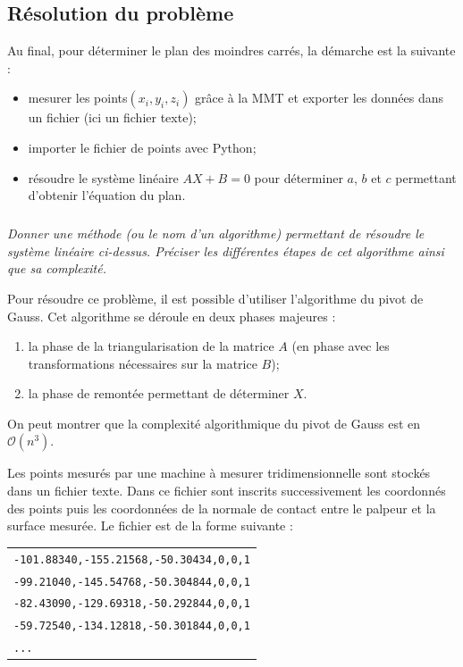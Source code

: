 \documentclass[10pt,fleqn]{article} %
\begin{document}
\else
\fi


\subsection{Résolution du problème}
\ifprof
\else
\begin{methode}
Au final, pour déterminer le plan des moindres carrés, la démarche est la suivante :
\begin{itemize}
\item mesurer les points$(x_i,y_i,z_i)$ grâce à la MMT et exporter les données dans un fichier (ici un fichier texte);
\item importer le fichier de points avec Python;
\item résoudre le système linéaire $AX+B=0$ pour déterminer $a$, $b$ et $c$ permettant d'obtenir l'équation du plan. 
\end{itemize}
\end{methode}
\fi

\subparagraph{}
\textit{Donner une méthode (ou le nom d'un algorithme) permettant de résoudre le système linéaire ci-dessus. Préciser les différentes étapes de cet algorithme ainsi que sa complexité.}


\ifprof
\begin{corrige}
Pour résoudre ce problème, il est possible d'utiliser l'algorithme du pivot de Gauss. Cet algorithme se déroule en deux phases majeures : 
\begin{enumerate}
\item la phase de la triangularisation de la matrice $A$ (en phase avec les transformations nécessaires sur la matrice $B$);
\item la phase de remontée permettant de déterminer $X$. 
\end{enumerate}

On peut montrer que la complexité algorithmique du pivot de Gauss est en $\mathcal{O}\left(n^3\right)$.
\end{corrige}
\else
\fi
\vspace{.5cm}

Les points mesurés par une machine à mesurer tridimensionnelle sont stockés dans un fichier texte. Dans ce fichier sont inscrits successivement les coordonnés des points puis les coordonnées de la normale de contact entre le palpeur et la surface mesurée. Le fichier est de la forme suivante : 

\begin{tabular}{l}
\texttt{-101.88340,-155.21568,-50.30434,0,0,1}\\
\texttt{-99.21040,-145.54768,-50.304844,0,0,1}\\
\texttt{-82.43090,-129.69318,-50.292844,0,0,1}\\
\texttt{-59.72540,-134.12818,-50.301844,0,0,1}\\
\texttt{...} \\
\end{tabular}
\end{document}
